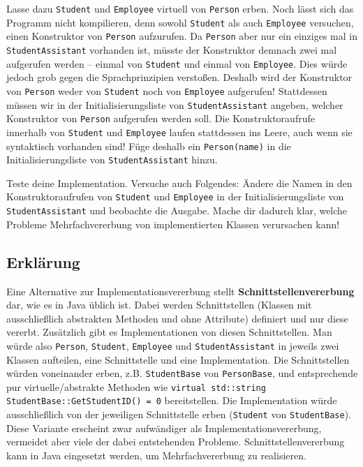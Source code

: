Lasse dazu \texttt{Student} und \texttt{Employee} virtuell von \texttt{Person} erben.
Noch lässt sich das Programm nicht kompilieren, denn sowohl \texttt{Student} als auch \texttt{Employee} versuchen, einen Konstruktor von \texttt{Person} aufzurufen.
Da \texttt{Person} aber nur ein einziges mal in \texttt{StudentAssistant} vorhanden ist, müsste der Konstruktor demnach zwei mal aufgerufen werden -- einmal von \texttt{Student} und einmal von \texttt{Employee}.
Dies würde jedoch grob gegen die Sprachprinzipien verstoßen.
Deshalb wird der Konstruktor von \texttt{Person} weder von \texttt{Student} noch von \texttt{Employee} aufgerufen!
Stattdessen müssen wir in der Initialisierungsliste von \texttt{StudentAssistant} angeben, welcher Konstruktor von \texttt{Person} aufgerufen werden soll.
Die Konstruktoraufrufe innerhalb von \texttt{Student} und \texttt{Employee} laufen stattdessen ins Leere, auch wenn sie syntaktisch vorhanden sind! Füge deshalb ein \texttt{Person(name)} in die Initialisierungsliste von \texttt{StudentAssistant} hinzu.

Teste deine Implementation.
Versuche auch Folgendes: Ändere die Namen in den Konstruktoraufrufen von \texttt{Student} und \texttt{Employee} in der Initialisierungsliste von \texttt{StudentAssistant} und beobachte die Ausgabe.
Mache dir dadurch klar, welche Probleme Mehrfachvererbung von implementierten Klassen verursachen kann!

\subsection{Erklärung}

Eine Alternative zur Implementationsvererbung stellt \textbf{Schnittstellenvererbung} dar, wie es in Java üblich ist. Dabei werden Schnittstellen (Klassen mit ausschließlich abstrakten Methoden und ohne Attribute) definiert und nur diese vererbt.
Zusätzlich gibt es Implementationen von diesen Schnittstellen.
Man würde also \texttt{Person}, \texttt{Student}, \texttt{Employee} und \texttt{StudentAssistant} in jeweils zwei Klassen aufteilen, eine Schnittstelle und eine Implementation.
Die Schnittstellen würden voneinander erben, z.B. \texttt{StudentBase} von \texttt{PersonBase}, und entsprechende pur virtuelle/abstrakte Methoden wie \texttt{virtual std::string StudentBase::GetStudentID() = 0} bereitstellen.
Die Implementation würde ausschließlich von der jeweiligen Schnittstelle erben (\texttt{Student} von \texttt{StudentBase}).
Diese Variante erscheint zwar aufwändiger als Implementationsvererbung, vermeidet aber viele der dabei entstehenden Probleme.
Schnittstellenvererbung kann in Java eingesetzt werden, um Mehrfachvererbung zu realisieren.
